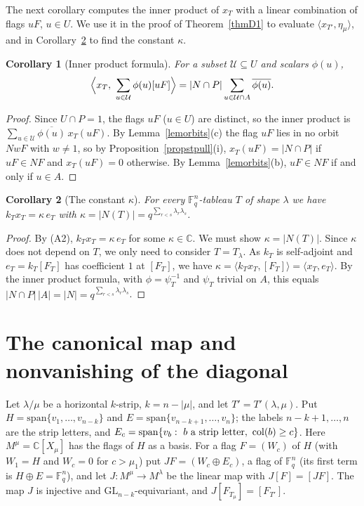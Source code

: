 \documentclass[11pt, letterpaper]{amsart}
\let\amstext\text
\renewcommand{\text}[1]{\amstext{\upshape #1}}%
\newtheorem{corollary}{Corollary}
\theoremstyle{definition}
\theoremstyle{remark}
\newcommand{\FF}{\mathbb{F}}
\newcommand{\CC}{\mathbb{C}}
\newcommand{\GL}{\mathrm{GL}}
\newcommand{\col}{\mathrm{col}}
\begin{document}
The next corollary computes the inner product of $x_T$ with a linear combination of flags $uF$, $u\in U$. We use it in the proof of Theorem~\ref{thmD1} to evaluate $\langle x_{T'},\eta_\mu\rangle$, and in Corollary~\ref{corkappa} to find the constant $\kappa$.

\begin{corollary}[Inner product formula]\label{corpair}
For a subset $\mathcal U\subseteq U$ and scalars $\phi(u)$,
\[
\Bigl\langle x_T,\ \sum_{u\in\mathcal U}\phi(u)[uF]\Bigr\rangle=|N\cap P|\sum_{u\in\mathcal U\cap A}\overline{\phi(u)}.
\]
\end{corollary}
\begin{proof}
Since $U\cap P=1$, the flags $uF$ ($u\in U$) are distinct, so the inner product is $\sum_{u\in\mathcal U}\overline{\phi(u)}\,x_T(uF)$. By Lemma~\ref{lemorbits}(c) the flag $uF$ lies in no orbit $NwF$ with $w\ne1$, so by Proposition~\ref{propstpull}(i), $x_T(uF)=|N\cap P|$ if $uF\in NF$ and $x_T(uF)=0$ otherwise. By Lemma~\ref{lemorbits}(b), $uF\in NF$ if and only if $u\in A$.
\end{proof}

\begin{corollary}[The constant $\kappa$]\label{corkappa}
For every $\FF_q^n$-tableau $T$ of shape $\lambda$ we have $k_Tx_T=\kappa\,e_T$ with $\kappa=|N(T)|=q^{\sum_{r<s}\lambda_r\lambda_s}$.
\end{corollary}
\begin{proof}
By (A2), $k_Tx_T=\kappa\,e_T$ for some $\kappa\in\CC$. We must show $\kappa=|N(T)|$. Since $\kappa$ does not depend on $T$, we only need to consider $T=T_\lambda$. As $k_T$ is self-adjoint and $e_T=k_T[F_T]$ has coefficient $1$ at $[F_T]$, we have $\kappa=\langle k_Tx_T,[F_T]\rangle=\langle x_T,e_T\rangle$. By the inner product formula, with $\phi=\psi_T^{-1}$ and $\psi_T$ trivial on $A$, this equals $|N\cap P|\,|A|=|N|=q^{\sum_{r<s}\lambda_r\lambda_s}$.
\end{proof}

\section{The canonical map and nonvanishing of the diagonal}\label{secD1}

Let $\lambda/\mu$ be a horizontal $k$-strip, $k=n-|\mu|$, and let $T'=T'(\lambda,\mu)$. Put $H=\mathrm{span}\{v_1,\dots,v_{n-k}\}$ and $E=\mathrm{span}\{v_{n-k+1},\dots,v_n\}$; the labels $n-k+1,\dots,n$ are the strip letters, and $E_c=\mathrm{span}\{v_b:\ b\ \text{a strip letter},\ \col(b)\ge c\}$. Here $M^\mu=\CC[X_\mu]$ has the flags of $H$ as a basis. For a flag $F=(W_c)$ of $H$ (with $W_1=H$ and $W_c=0$ for $c>\mu_1$) put $JF=(W_c\oplus E_c)$, a flag of $\FF_q^n$ (its first term is $H\oplus E=\FF_q^n$), and let $J\colon M^\mu\to M^\lambda$ be the linear map with $J[F]=[JF]$. The map $J$ is injective and $\GL_{n-k}$-equivariant, and $J[F_{T_\mu}]=[F_{T'}]$.
\end{document}
